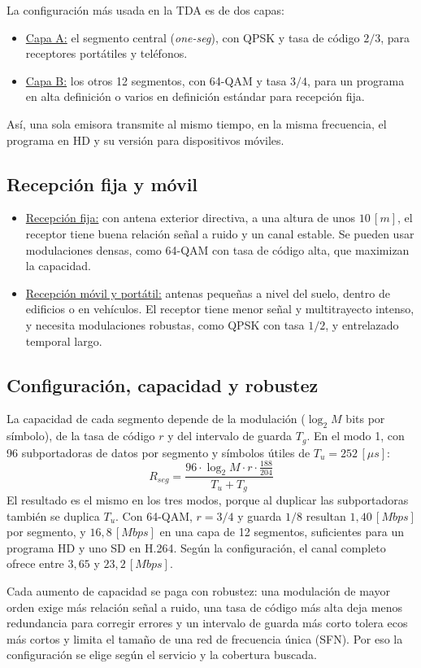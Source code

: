 La configuración más usada en la TDA es de dos capas:
\begin{itemize}
    \item \underline{Capa A:} el segmento central (\textit{one-seg}), con QPSK y tasa de código $2/3$, para receptores portátiles y teléfonos.
    \item \underline{Capa B:} los otros 12 segmentos, con 64-QAM y tasa $3/4$, para un programa en alta definición o varios en definición estándar para recepción fija.
\end{itemize}
Así, una sola emisora transmite al mismo tiempo, en la misma frecuencia, el programa en HD y su versión para dispositivos móviles.

\subsection{Recepción fija y móvil}
\begin{itemize}
    \item \underline{Recepción fija:} con antena exterior directiva, a una altura de unos $10 \, [m]$, el receptor tiene buena relación señal a ruido y un canal estable. Se pueden usar modulaciones densas, como 64-QAM con tasa de código alta, que maximizan la capacidad.
    \item \underline{Recepción móvil y portátil:} antenas pequeñas a nivel del suelo, dentro de edificios o en vehículos. El receptor tiene menor señal y multitrayecto intenso, y necesita modulaciones robustas, como QPSK con tasa $1/2$, y entrelazado temporal largo.
\end{itemize}

\subsection{Configuración, capacidad y robustez}
La capacidad de cada segmento depende de la modulación ($\log_2 M$ bits por símbolo), de la tasa de código $r$ y del intervalo de guarda $T_g$. En el modo 1, con 96 subportadoras de datos por segmento y símbolos útiles de $T_u = 252 \, [\mu s]$:
\begin{equation}
    R_{seg} = \frac{96 \cdot \log_2 M \cdot r \cdot \frac{188}{204}}{T_u + T_g}
    \label{eq:tasa_segmento}
\end{equation}
El resultado es el mismo en los tres modos, porque al duplicar las subportadoras también se duplica $T_u$. Con 64-QAM, $r = 3/4$ y guarda $1/8$ resultan $1{,}40 \, [Mbps]$ por segmento, y $16{,}8 \, [Mbps]$ en una capa de 12 segmentos, suficientes para un programa HD y uno SD en H.264. Según la configuración, el canal completo ofrece entre $3{,}65$ y $23{,}2 \, [Mbps]$.

Cada aumento de capacidad se paga con robustez: una modulación de mayor orden exige más relación señal a ruido, una tasa de código más alta deja menos redundancia para corregir errores y un intervalo de guarda más corto tolera ecos más cortos y limita el tamaño de una red de frecuencia única (SFN). Por eso la configuración se elige según el servicio y la cobertura buscada.
